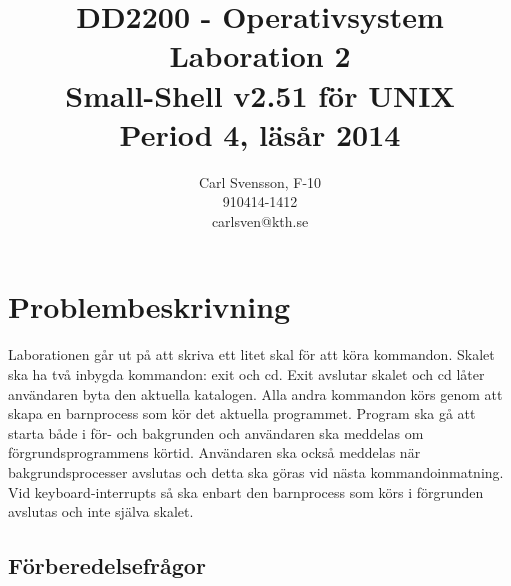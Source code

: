 \documentclass[10pt,a4paper]{article}
\title{DD2200 - Operativsystem \\ Laboration 2 \\ Small-Shell v2.51 för UNIX \\ Period 4, läsår 2014}
\author{Carl Svensson, F-10 \\ 910414-1412 \\ carlsven@kth.se}
\date{}
\begin{document}
\maketitle
\tableofcontents
\clearpage

\section{Problembeskrivning}

Laborationen går ut på att skriva ett litet skal för att köra kommandon. Skalet ska ha två inbygda kommandon: exit och cd. Exit avslutar skalet och cd låter användaren byta den aktuella katalogen. Alla andra kommandon körs genom att skapa en barnprocess som kör det aktuella programmet. Program ska gå att starta både i för- och bakgrunden och användaren ska meddelas om förgrundsprogrammens körtid. Användaren ska också meddelas när bakgrundsprocesser avslutas och detta ska göras vid nästa kommandoinmatning. Vid keyboard-interrupts så ska enbart den barnprocess som körs i förgrunden avslutas och inte själva skalet.

\subsection{Förberedelsefrågor}
\end{document}
